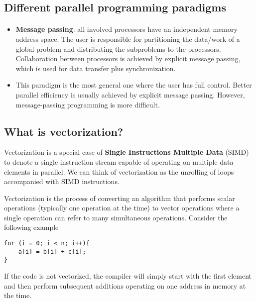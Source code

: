 \documentclass[%
oneside,                 %
final,                   %
10pt]{article}
\begin{document}
\noindent


\subsection*{Different parallel programming paradigms}

\paragraph{}

\begin{itemize}
\item \textbf{Message passing}:  all involved processors have an independent memory address space. The user is responsible for  partitioning the data/work of a global problem and distributing the  subproblems to the processors. Collaboration between processors is achieved by explicit message passing, which is used for data transfer plus synchronization.

\item This paradigm is the most general one where the user has full control. Better parallel efficiency is usually achieved by explicit message passing. However, message-passing programming is more difficult.
\end{itemize}

\noindent




\subsection*{What is vectorization?}
Vectorization is a special
case of \textbf{Single Instructions Multiple Data} (SIMD) to denote a single
instruction stream capable of operating on multiple data elements in
parallel. 
We can think of vectorization as the unrolling of loops accompanied with SIMD instructions.

Vectorization is the process of converting an algorithm that performs scalar operations
(typically one operation at the time) to vector operations where a single operation can refer to many simultaneous operations.
Consider the following example
\begin{verbatim}
for (i = 0; i < n; i++){
    a[i] = b[i] + c[i];
}
\end{verbatim}
If the code is not vectorized, the compiler will simply start with the first element and 
then perform subsequent additions operating on one address in memory at the time. 
\end{document}
